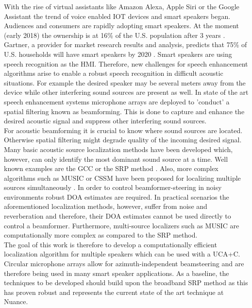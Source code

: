 With the rise of virtual assistants like Amazon Alexa, Apple Siri or the Google Assistant the trend of voice enabled \ac{IOT} devices and smart speakers began. Audiences and consumers are rapidly adopting smart speakers. At the moment (early 2018) the ownership is at 16\% of the U.S. population after 3 years \cite{smartreport}. Gartner, a provider for market research results and analysis, predicts that 75\% of U.S. households will have smart speakers by 2020 \cite{gartner}. Smart speakers are using speech recognition as the \ac{HMI}. Therefore, new challenges for speech enhancement algorithms arise to enable a robust speech recognition in difficult acoustic situations. For example the desired speaker may be several meters away from the device while other interfering sound sources are present as well. In state of the art speech enhancement systems microphone arrays are deployed to 'conduct' a spatial filtering known as beamforming. This is done to capture and enhance the desired acoustic signal and suppress other interfering sound sources.\\

For acoustic beamforming it is crucial to know where sound sources are located. Otherwise spatial filtering might degrade quality of the incoming desired signal. Many basic acoustic source localization methods have been developed which, however, can only identify the most dominant sound source at a time. Well known examples are the \ac{GCC} or the \ac{SRP} method \cite[Chapter~8]{brandstein2013microphone}. Also, more complex algorithms such as \ac{MUSIC} or \ac{CSSM} have been proposed for localizing multiple sources simultaneously \cite{krolik1989multiple,1164667}. In order to control beamformer-steering in noisy environments robust \ac{DOA} estimates are required. In practical scenarios the aforementioned localization methods, however, suffer from noise and reverberation and therefore, their \ac{DOA} estimates cannot be used directly to control a beamformer. Furthermore, multi-source localizers such as \ac{MUSIC} are computationally more complex as compared to the \ac{SRP} method. \\

The goal of this work is therefore to develop a computationally efficient localization algorithm for multiple speakers which can be used with a \ac{UCA+C}. Circular microphone arrays allow for azimuth-independent beamsteering and are therefore being used in many smart speaker applications. As a baseline, the techniques to be developed should build upon the broadband \ac{SRP} method as this has proven robust and represents the current state of the art technique at Nuance. \\

